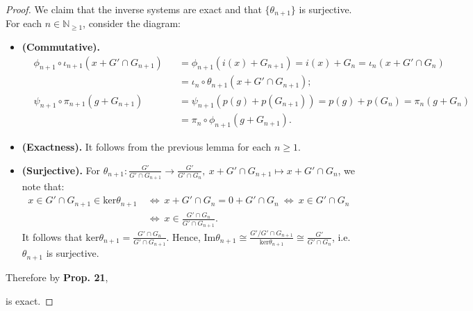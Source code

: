 \documentclass[12pt,a4paper,footinclude=true,headinclude=true]{scrbook} %
\begin{document}
\begin{proof}
    We claim that the inverse systems are exact and that $\{\theta_{n+1}\}$ is surjective. \\ For each $n\in\mathbb{N}_{\geq1}$, consider the diagram:
    \begin{center}
    \end{center}
    \begin{itemize}
        \item \textbf{(Commutative).}
        \begin{align*}
            &\phi_{n+1}\circ\iota_{n+1}(x+G'\cap G_{n+1}) & &= \phi_{n+1}(i(x)+G_{n+1})=i(x)+G_n
            =\iota_n(x+G'\cap G_n)\\ & & &=\iota_n\circ\theta_{n+1}(x+G'\cap G_{n+1});\\
            &\psi_{n+1}\circ\pi_{n+1}(g+G_{n+1}) & &=\psi_{n+1}(p(g)+p(G_{n+1}))=p(g)+p(G_n)=\pi_n(g+G_n)\\ & & &= \pi_n\circ\phi_{n+1}(g+G_{n+1}).
        \end{align*}
        \item \textbf{(Exactness).} It follows from the previous lemma for each $n\geq1$.
        \item \textbf{(Surjective).} For $\theta_{n+1}:\frac{G'}{G'\cap G_{n+1}}\to\frac{G'}{G'\cap G_n},\ x+G'\cap G_{n+1}\mapsto x+G'\cap G_n$, we note that:
        \begin{align*}
            x\in G'\cap G_{n+1}\in\mathrm{ker}\theta_{n+1}\ &\Leftrightarrow\ x+G'\cap G_n=0+G'\cap G_n\ \Leftrightarrow\ x\in G'\cap G_n\\ &\Leftrightarrow\ x\in\tfrac{G'\cap G_n}{G'\cap G_{n+1}}.
        \end{align*}
        It follows that $\mathrm{ker}\theta_{n+1}=\frac{G'\cap G_n}{G'\cap G_{n+1}}$. Hence, $\mathrm{Im}\theta_{n+1}\cong\frac{G'/G'\cap G_{n+1}}{\mathrm{ker}\theta_{n+1}}\cong\frac{G'}{G'\cap G_n}$, i.e. $\theta_{n+1}$ is surjective.
    \end{itemize}
    Therefore by \textbf{Prop. 21},  
    \begin{center}
    \end{center}
    is exact.
\end{proof}
\end{document}
